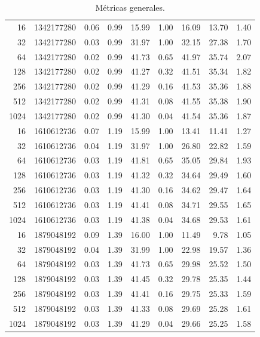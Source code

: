\begin{table}[H]
\begin{adjustbox}{width=\textwidth, keepaspectratio}
\begin{tabular}{rrrrrrrrr}
                    16 & 1342177280 & 0.06 & 0.99 & 15.99 & 1.00 & 16.09 & 13.70 & 1.40 \\
                    32 & 1342177280 & 0.03 & 0.99 & 31.97 & 1.00 & 32.15 & 27.38 & 1.70 \\
                    64 & 1342177280 & 0.02 & 0.99 & 41.73 & 0.65 & 41.97 & 35.74 & 2.07 \\
                    128 & 1342177280 & 0.02 & 0.99 & 41.27 & 0.32 & 41.51 & 35.34 & 1.82 \\
                    256 & 1342177280 & 0.02 & 0.99 & 41.29 & 0.16 & 41.53 & 35.36 & 1.88 \\
                    512 & 1342177280 & 0.02 & 0.99 & 41.31 & 0.08 & 41.55 & 35.38 & 1.90 \\
                    1024 & 1342177280 & 0.02 & 0.99 & 41.30 & 0.04 & 41.54 & 35.36 & 1.87 \\
                    
                    16 & 1610612736 & 0.07 & 1.19 & 15.99 & 1.00 & 13.41 & 11.41 & 1.27 \\
                    32 & 1610612736 & 0.04 & 1.19 & 31.97 & 1.00 & 26.80 & 22.82 & 1.59 \\
                    64 & 1610612736 & 0.03 & 1.19 & 41.81 & 0.65 & 35.05 & 29.84 & 1.93 \\
                    128 & 1610612736 & 0.03 & 1.19 & 41.32 & 0.32 & 34.64 & 29.49 & 1.60 \\
                    256 & 1610612736 & 0.03 & 1.19 & 41.30 & 0.16 & 34.62 & 29.47 & 1.64 \\
                    512 & 1610612736 & 0.03 & 1.19 & 41.41 & 0.08 & 34.71 & 29.55 & 1.65 \\
                    1024 & 1610612736 & 0.03 & 1.19 & 41.38 & 0.04 & 34.68 & 29.53 & 1.61 \\
                   
                    16 & 1879048192 & 0.09 & 1.39 & 16.00 & 1.00 & 11.49 & 9.78 & 1.05 \\
                    32 & 1879048192 & 0.04 & 1.39 & 31.99 & 1.00 & 22.98 & 19.57 & 1.36 \\
                    64 & 1879048192 & 0.03 & 1.39 & 41.73 & 0.65 & 29.98 & 25.52 & 1.50 \\
                    128 & 1879048192 & 0.03 & 1.39 & 41.45 & 0.32 & 29.78 & 25.35 & 1.44 \\
                    256 & 1879048192 & 0.03 & 1.39 & 41.41 & 0.16 & 29.75 & 25.33 & 1.59 \\
                    512 & 1879048192 & 0.03 & 1.39 & 41.33 & 0.08 & 29.69 & 25.28 & 1.61 \\
                    1024 & 1879048192 & 0.03 & 1.39 & 41.29 & 0.04 & 29.66 & 25.25 & 1.58 \\
                    \bottomrule
                \end{tabular}
            \end{adjustbox}
            \caption{Métricas generales.}
            \label{tab:daxpy_metrics}
        \end{table}  
